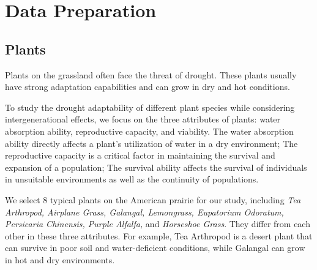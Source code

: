 \documentclass{mcmthesis}
\begin{document}
\section{Data Preparation}

\subsection{Plants}

\indent

Plants on the grassland often face the threat of drought. These plants usually have strong adaptation capabilities and can grow in dry and hot conditions. 

To study the drought adaptability of different plant species while considering intergenerational effects, we focus on the three attributes of plants: water absorption ability, reproductive capacity, and viability. The water absorption ability directly affects a plant's utilization of water in a dry environment; The reproductive capacity is a critical factor in maintaining the survival and expansion of a population; The survival ability affects the survival of individuals in unsuitable environments as well as the continuity of populations.

We select $8$ typical plants on the American prairie for our study, including \textit{Tea Arthropod, Airplane Grass, Galangal, Lemongrass, Eupatorium Odoratum, Persicaria Chinensis, Purple Alfalfa, }and \textit{Horseshoe Grass}. They differ from each other in these three attributes. For example, Tea Arthropod is a desert plant that can survive in poor soil and water-deficient conditions, while Galangal can grow in hot and dry environments.
\end{document}
